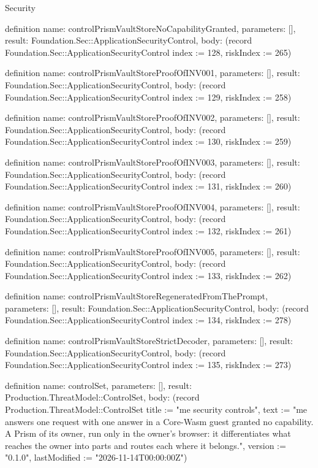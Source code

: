 \begin{lexlean}{Security}
\begin{semanticmodule}
definition{
  name: controlPrismVaultStoreNoCapabilityGranted,
  parameters: [],
  result: Foundation.Sec::ApplicationSecurityControl,
  body: (record Foundation.Sec::ApplicationSecurityControl {index := 128, riskIndex := 265})
}

definition{
  name: controlPrismVaultStoreProofOfINV001,
  parameters: [],
  result: Foundation.Sec::ApplicationSecurityControl,
  body: (record Foundation.Sec::ApplicationSecurityControl {index := 129, riskIndex := 258})
}

definition{
  name: controlPrismVaultStoreProofOfINV002,
  parameters: [],
  result: Foundation.Sec::ApplicationSecurityControl,
  body: (record Foundation.Sec::ApplicationSecurityControl {index := 130, riskIndex := 259})
}

definition{
  name: controlPrismVaultStoreProofOfINV003,
  parameters: [],
  result: Foundation.Sec::ApplicationSecurityControl,
  body: (record Foundation.Sec::ApplicationSecurityControl {index := 131, riskIndex := 260})
}

definition{
  name: controlPrismVaultStoreProofOfINV004,
  parameters: [],
  result: Foundation.Sec::ApplicationSecurityControl,
  body: (record Foundation.Sec::ApplicationSecurityControl {index := 132, riskIndex := 261})
}

definition{
  name: controlPrismVaultStoreProofOfINV005,
  parameters: [],
  result: Foundation.Sec::ApplicationSecurityControl,
  body: (record Foundation.Sec::ApplicationSecurityControl {index := 133, riskIndex := 262})
}

definition{
  name: controlPrismVaultStoreRegeneratedFromThePrompt,
  parameters: [],
  result: Foundation.Sec::ApplicationSecurityControl,
  body: (record Foundation.Sec::ApplicationSecurityControl {index := 134, riskIndex := 278})
}

definition{
  name: controlPrismVaultStoreStrictDecoder,
  parameters: [],
  result: Foundation.Sec::ApplicationSecurityControl,
  body: (record Foundation.Sec::ApplicationSecurityControl {index := 135, riskIndex := 273})
}

definition{
  name: controlSet,
  parameters: [],
  result: Production.ThreatModel::ControlSet,
  body: (record Production.ThreatModel::ControlSet {title := "me security controls", text := "me answers one request with one answer in a Core-Wasm guest granted no capability. A Prism of its owner, run only in the owner's browser: it differentiates what reaches the owner into parts and routes each where it belongs.", version := "0.1.0", lastModified := "2026-11-14T00:00:00Z"})
}


\end{semanticmodule}
\end{lexlean}
